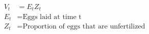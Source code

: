\documentclass[fleqn, oneside, 11pt]{article}%
\begin{document}
\begin{preview}
\begin{align*}%
V_{t} & = E_{t}Z_{t}\nonumber \\
E_{t} & =  \text{Eggs laid at time t} \nonumber \\
Z_{t} & =  \text{Proportion of eggs that are unfertilized} \nonumber \\
\end{align*} 
\end{preview}
\end{document}
